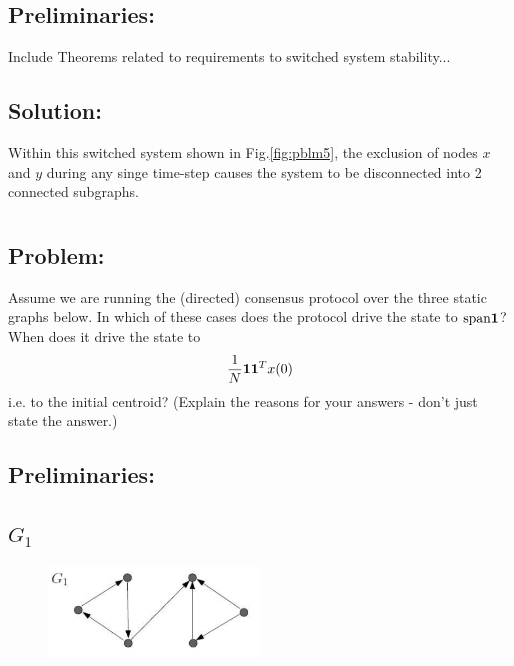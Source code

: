 \documentclass[]{article}
\numberwithin{equation}{section}
\renewcommand{\figurename}{Fig.}
\begin{document}
\subsection*{Preliminaries:}
Include Theorems related to requirements to switched system stability... 

\subsection*{Solution:}
Within this switched system shown in \figurename \ref{fig:pblm5}, the exclusion of nodes $x$ and $y$ during any singe time-step causes the system to be disconnected into 2 connected subgraphs. 




\newpage
\section{}
\subsection*{Problem:}
Assume we are running the (directed) consensus protocol over the three static graphs below.
In which of these cases does the protocol drive the state to $\text{span}\vb{1}$?
When does it drive the state to \[
    \frac{1}{N} \vb{1} \vb{1}^T x(0)
\] i.e. to the initial centroid?
(Explain the reasons for your answers - don't just state the answer.)

\subsection*{Preliminaries:}









\subsection{$G_1$}
\begin{figure}[h]
    \centering
    \includegraphics[width=0.5\textwidth]{figs/pblm6a.png}
\end{figure}
\end{document}

